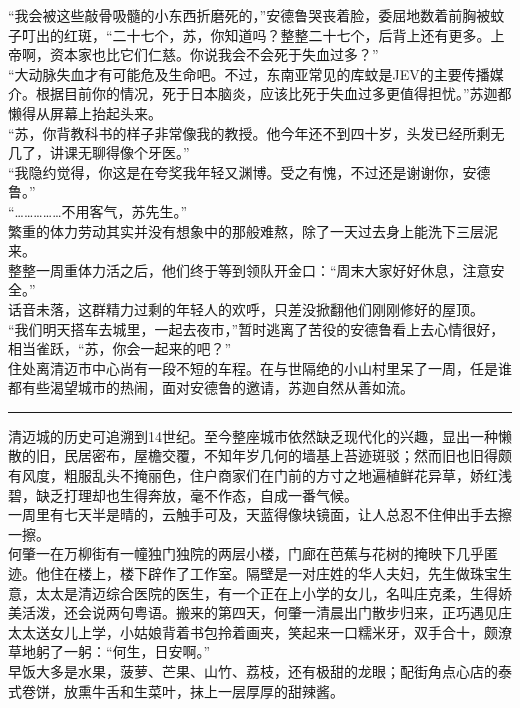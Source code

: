 \documentclass[oneside,11pt]{memoir} %
\begin{document}
\begin{CJK}{UTF8}{gbsn}
    “我会被这些敲骨吸髓的小东西折磨死的，”安德鲁哭丧着脸，委屈地数着前胸被蚊子叮出的红斑，“二十七个，苏，你知道吗？整整二十七个，后背上还有更多。上帝啊，资本家也比它们仁慈。你说我会不会死于失血过多？”\\\indent
    “大动脉失血才有可能危及生命吧。不过，东南亚常见的库蚊是JEV的主要传播媒介。根据目前你的情况，死于日本脑炎，应该比死于失血过多更值得担忧。”苏迦都懒得从屏幕上抬起头来。\\\indent
    “苏，你背教科书的样子非常像我的教授。他今年还不到四十岁，头发已经所剩无几了，讲课无聊得像个牙医。”\\\indent
    “我隐约觉得，你这是在夸奖我年轻又渊博。受之有愧，不过还是谢谢你，安德鲁。”\\\indent
    “……………不用客气，苏先生。”\\\indent
    繁重的体力劳动其实并没有想象中的那般难熬，除了一天过去身上能洗下三层泥来。\\\indent
    整整一周重体力活之后，他们终于等到领队开金口：“周末大家好好休息，注意安全。”\\\indent
    话音未落，这群精力过剩的年轻人的欢呼，只差没掀翻他们刚刚修好的屋顶。\\\indent
    “我们明天搭车去城里，一起去夜市，”暂时逃离了苦役的安德鲁看上去心情很好，相当雀跃，“苏，你会一起来的吧？”\\\indent
    住处离清迈市中心尚有一段不短的车程。在与世隔绝的小山村里呆了一周，任是谁都有些渴望城市的热闹，面对安德鲁的邀请，苏迦自然从善如流。\\\indent
\rule{-3pt}{30pt}
    清迈城的历史可追溯到14世纪。至今整座城市依然缺乏现代化的兴趣，显出一种懒散的旧，民居密布，屋檐交覆，不知年岁几何的墙基上苔迹斑驳；然而旧也旧得颇有风度，粗服乱头不掩丽色，住户商家们在门前的方寸之地遍植鲜花异草，娇红浅碧，缺乏打理却也生得奔放，毫不作态，自成一番气候。\\\indent
    一周里有七天半是晴的，云触手可及，天蓝得像块镜面，让人总忍不住伸出手去擦一擦。\\\indent
    何肇‪一在万柳街有一幢独门独院‪的两层小楼，门廊在芭蕉与花树的掩映下几乎匿迹。他住在楼上，楼下辟作了工作室。隔壁是一对庄姓的华人夫妇，先生做珠宝生意，太太是清迈综合医院的医生，有一个正在上小学的女儿，名叫庄克柔，生得娇美活泼，还会说两句粤语。搬来的第四天，何肇一清晨出门散步归来，正巧遇见庄太太送女儿上学，小姑娘背着书包拎着画夹，笑起来一口糯米牙，双手合十，颇潦草地躬了一躬：“何生，日安啊。”\\\indent
    早饭大多是水果，菠萝、芒果、山竹、荔枝，还有极甜的龙眼；‪配街角点心店的泰式卷饼，放熏牛舌和生菜叶，抹上一层厚厚的甜辣酱。\\\indent

\end{CJK}
\end{document}
